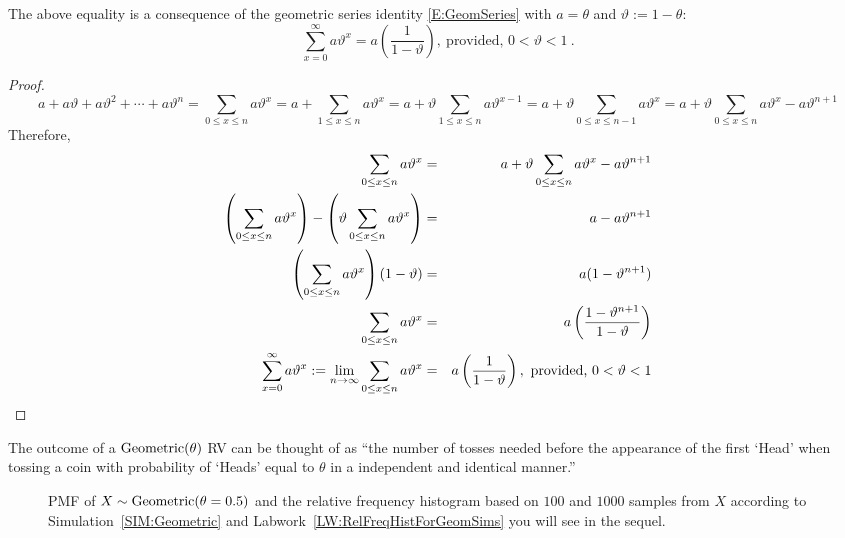 \begin{model}
{\scriptsize
The above equality is a consequence of the geometric series identity \eqref{E:GeomSeries} with $a=\theta$ and $\vartheta:=1-\theta$:
\begin{equation}\label{E:GeomSeries}
 \sum_{ x =0}^{\infty} a \vartheta^x = a \left( \frac{1}{1-\vartheta} \right) , \ \text{provided, } 0 < \vartheta < 1 \ .
\end{equation}
\begin{proof}
\[
a+a\vartheta+a\vartheta^2+\cdots+a\vartheta^n
= \sum_{0 \leq x \leq n} a \vartheta^x
= a+ \sum_{1 \leq x \leq n} a \vartheta^x
= a +  \vartheta  \sum_{1 \leq x \leq n} a \vartheta^{x-1}
= a +  \vartheta  \sum_{0 \leq x \leq n-1} a \vartheta^{x}
= a +  \vartheta  \sum_{0 \leq x \leq n} a \vartheta^{x} - a \vartheta^{n+1}
\]
Therefore,
\begin{eqnarray}
\sum_{0 \leq x \leq n} a \vartheta^x
&=&  a +  \vartheta  \sum_{0 \leq x \leq n} a \vartheta^{x} - a \vartheta^{n+1} \notag \\
\left( \sum_{0 \leq x \leq n} a \vartheta^x \right) - \left( \vartheta  \sum_{0 \leq x \leq n} a \vartheta^{x} \right)
&=&  a  - a \vartheta^{n+1} \notag \\
\left( \sum_{0 \leq x \leq n} a \vartheta^x \right) (1-\vartheta)
&=&  a (1 -  \vartheta^{n+1}) \notag \\
\sum_{0 \leq x \leq n} a \vartheta^x
&=&  a \left( \frac{1 -  \vartheta^{n+1}}{1-\vartheta} \right) \notag\\
 \sum_{ x =0}^{\infty} a \vartheta^x  := \lim_{n \rightarrow \infty} \sum_{0 \leq x \leq n} a \vartheta^x
&=&  a \left( \frac{1}{1-\vartheta} \right) , \ \text{provided, } 0 < \vartheta < 1 \notag
\end{eqnarray}
\end{proof}
}
The outcome of a $\mbox{{\rm Geometric}}(\theta)$ RV can be thought of as ``the number of tosses needed before the appearance of the first `Head' when tossing a coin with probability of `Heads' equal to $\theta$ in a independent and identical manner.''
\end{model}

\begin{figure}[htpb]
\caption{PMF of $X \sim \mbox{{\rm Geometric}}(\theta=0.5)$ and the relative frequency histogram based on $100$ and $1000$ samples from $X$ according to Simulation~\ref{SIM:Geometric} and Labwork~\ref{LW:RelFreqHistForGeomSims} you will see in the sequel.\label{F:PlotPdfSimHistGeomthetaHalf}}
\centering   {}
\end{figure}

